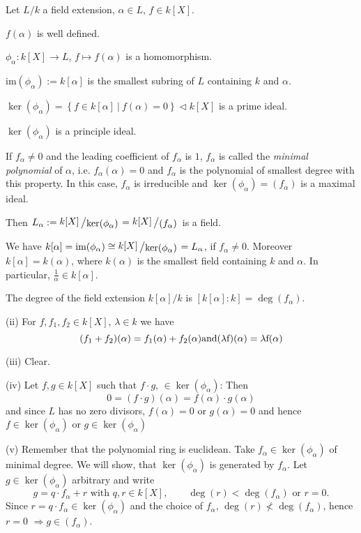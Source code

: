 \documentclass[11pt]{book}
\theoremstyle{nonumberbreak}
\newenvironment{pr}[1][]{\ifthenelse{\equal{#1}{}}{\proof}{\proof[#1]}\rm}{\endproof}
\newenvironment{er}[1][]{\ifthenelse{\equal{#1}{}}{\erinner}{\erinner[#1]}\rm}{\enderinner}
\newcommand{\slant}[2]{{\raisebox{.1em}{$#1$}\left/\raisebox{-.1em}{$#2$}\right.}}
\begin{document}
\begin{spacing}{1.3}
\begin{er} %
Let $L/k$ a field extension, $\alpha \in L$, $f \in k[X]$.
\begin{compactenum}
\item $f(\alpha)$ is well defined.
\item $\phi_{\alpha}: k[X] \rightarrow L$, $f \mapsto f(\alpha)$ is a homomorphism.
\item $\textrm{im}(\phi_{\alpha}):=k[\alpha]$ is the smallest subring of $L$ containing $k$ and $\alpha$.
\item $\ker(\phi_{\alpha})=\left\{f \in k[\alpha] \ \big \vert \ f(\alpha)=0\right\} \triangleleft k[X]$ is a prime ideal.
\item $\ker(\phi_{\alpha})$ is a principle ideal.
\item If $f_{\alpha}\neq 0$ and the leading coefficient of $f_{\alpha}$ is $1$, $f_{\alpha}$ is called the \textit{minimal polynomial} of $\alpha$, i.e. $f_{\alpha}(\alpha)=0$ and $f_{\alpha}$ is the polynomial of smallest degree with this property. In this case, $f_{\alpha}$ is irreducible and $\ker(\phi_{\alpha})=( f_{\alpha} )$ is a maximal ideal.
\item Then $L_{\alpha}:=\slant{k[X]}{\ker(\phi_{\alpha})}=\slant{k[X]}{( f_{\alpha})}$ is a field.
\item We have $k[\alpha]=\textrm{im}(\phi_{\alpha}) \cong \slant{k[X]}{\ker(\phi_{\alpha})}=L_{\alpha}$, if $f_{\alpha}\neq 0$.
Moreover $k[\alpha]=k(\alpha)$, where $k(\alpha)$ is the smallest field containing $k$ and $\alpha$. In particular, $\frac{1}{\alpha} \in k[\alpha]$.
\item The degree of the field extension $k[\alpha]/k$ is $[k[\alpha]:k]=\deg(f_{\alpha})$. 
\end{compactenum}
\begin{pr}
\begin{compactenum}
\item[(ii)]  For $f,f_1,f_2 \in k[X]$, $\lambda \in k$ we have
$$(f_1+f_2)(\alpha)=f_1(\alpha)+f_2(\alpha)\rm{ and }(\lambda f)(\alpha)=\lambda f(\alpha)$$
\item[(iii)] Clear.
\item[(iv)] Let $f,g \in k[X]$ such that $f\cdot g$, $\in \ker(\phi_{\alpha})$: Then
$$0=(f\cdot g)(\alpha)=f(\alpha) \cdot g(\alpha)$$
and since $L$ has no zero divisors, $f(\alpha)=0$ or $g(\alpha)=0$ and hence $f \in \ker(\phi_{\alpha})$ or $g \in \ker(\phi_{\alpha})$
\item[(v)] Remember that the polynomial ring is euclidean. Take $f_{\alpha} \in \ker(\phi_{\alpha})$ of minimal degree. We will show, that $\ker(\phi_{\alpha})$ is generated by $f_{\alpha}$. Let $g \in \ker(\phi_{\alpha})$ arbitrary and write $$g=q \cdot f_{\alpha} + r\textrm{ with }q,r \in k[X], \qquad \deg(r)<\deg(f_{\alpha})\textrm{ or }r=0.$$Since $r=q\cdot f_{\alpha} \in \ker(\phi_{\alpha})$ and the choice of $f_{\alpha}$, $\deg(r) \nless \deg(f_{\alpha})$, hence $r=0$ $\Rightarrow g \in ( f_{\alpha} )$.

\end{compactenum}
\end{pr}
\end{er}
\end{spacing}
\end{document}
